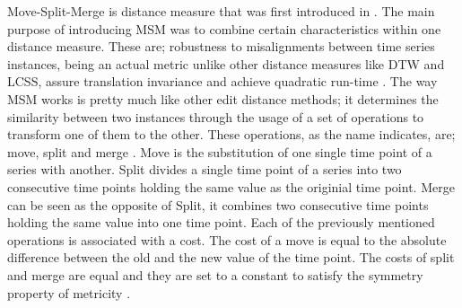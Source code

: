 Move-Split-Merge is distance measure that was first introduced in \cite{stefan2012move}.
The main purpose of introducing MSM was to combine certain characteristics within one distance measure.
These are; robustness to misalignments between time series instances, being an actual metric unlike other distance measures like DTW and LCSS,
assure translation invariance and achieve quadratic run-time \cite{lines2015time}.\newline
The way MSM works is pretty much like other edit distance methods; it determines the similarity between two instances
through the usage of a set of operations to transform one of them to the other. These operations, as the name indicates, are; move, split and merge \cite{bagnall2017great}.\newline
Move is the substitution of one single time point of a series with another.
Split divides a single time point of a series into two consecutive time points holding the same value as the originial time point.
Merge can be seen as the opposite of Split, it combines two consecutive time points holding the same value into one time point.\newline
Each of the previously mentioned operations is associated with a cost.
The cost of a move is equal to the absolute difference between the old and the new value of the time point.
The costs of split and merge are equal and they are set to a constant to satisfy the symmetry property of metricity \cite{stefan2012move,tan2020fastee}.